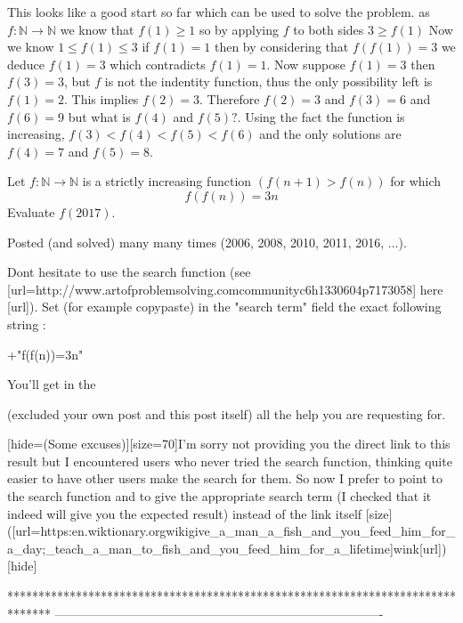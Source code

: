 \begin{solution}
	This looks like a good start so far which can be used to solve the problem.
as $f: \mathbb{N} \longrightarrow \mathbb{N}$ we know that $f(1) \geq 1$ so by applying $f$ to both sides $3\geq f(1)$
Now we know $1\leq f(1) \leq 3$ if $f(1)=1$ then by considering that $f(f(1))=3$ we deduce $f(1)=3$ which contradicts $f(1)=1$. Now suppose $f(1)=3$ then $f(3)=3$, but $f$ is not the indentity function, thus the only possibility left is $f(1)=2$. This implies $f(2)=3$. Therefore $f(2)=3$ and $f(3)=6$ and $f(6)=9$ but what is $f(4)$ and $f(5)?$. Using the fact the function is increasing, $f(3)<f(4)<f(5)<f(6)$ and the only solutions are $f(4)=7$ and $f(5)=8$.
\end{solution}



\begin{solution}
	\begin{tcolorbox}Let $f: \mathbb{N} \longrightarrow \mathbb{N}$ is a strictly increasing  function $(f(n+1)>f(n))$ for which 
$$f(f(n))=3n$$
Evaluate $f(2017)$.\end{tcolorbox}
Posted (and solved) many many times (2006, 2008, 2010, 2011, 2016, ...).

Dont hesitate to use the search function (see [url=http://www.artofproblemsolving.com\/community\/c6h1330604p7173058] here [\/url]).
Set (for example copy\/paste) in the "search term" field the exact following string : 

+"f(f(n))=3n"

You'll get in the  (excluded your own post and this post itself) all the help you are requesting for.

[hide=(Some excuses)][size=70]I'm sorry not providing you the direct link to this result but I encountered users who never tried the search function, thinking quite easier to have other users make the search for them. So now I prefer to point to the search function and to give the appropriate search term (I checked that it indeed will give you the expected result) instead of the link itself [\/size]([url=https:\/\/en.wiktionary.org\/wiki\/give_a_man_a_fish_and_you_feed_him_for_a_day;_teach_a_man_to_fish_and_you_feed_him_for_a_lifetime]wink[\/url])[\/hide]



\end{solution}
*******************************************************************************
-------------------------------------------------------------------------------

